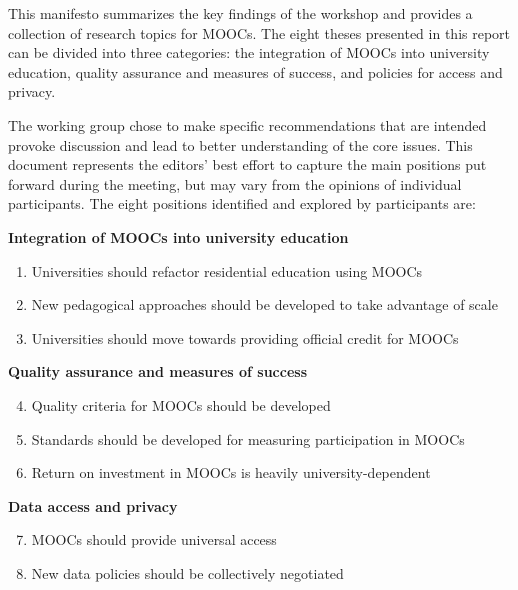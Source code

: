 
This manifesto summarizes the key findings of the workshop and provides
a collection of research topics for MOOCs. The eight theses presented in
this report can be divided into three categories: the integration of
MOOCs into university education, quality assurance and measures of
success, and policies for access and privacy.


The working group chose to make specific recommendations that are intended provoke discussion 
and lead to better understanding of the core issues. This document represents the
editors' best effort to capture the main positions put forward during the meeting,
but may vary from the opinions of individual participants.
The eight positions identified and explored by participants are:

\vspace{1ex}
\textbf{Integration of MOOCs into university education}

\begin{enumerate}

\item Universities should refactor residential education using
MOOCs

\item New pedagogical approaches should be developed to take
advantage of scale

\item Universities should move towards providing official
credit for MOOCs

\end{enumerate}

\textbf{Quality assurance and measures of success}

\begin{enumerate}
\setcounter{enumi}{3}

\item Quality criteria for MOOCs should be developed

\item Standards should be developed for measuring
  participation in MOOCs

\item Return on investment in MOOCs is heavily university-dependent

\end{enumerate}

\textbf{Data access and privacy}

\begin{enumerate}
\setcounter{enumi}{6}

\item MOOCs should provide universal access

\item New data
policies should be collectively negotiated

\end{enumerate}



